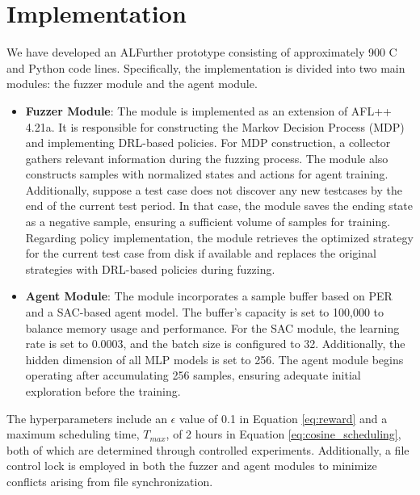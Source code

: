 \documentclass[lettersize,journal]{IEEEtran}
\begin{document}
\section{Implementation}
We have developed an ALFurther prototype consisting of approximately 900 C and Python code lines. Specifically, the implementation is divided into two main modules: the fuzzer module and the agent module.
\begin{itemize}
	\item \textbf{Fuzzer Module}: The module is implemented as an extension of AFL++ 4.21a. It is responsible for constructing the Markov Decision Process (MDP) and implementing DRL-based policies. For MDP construction, a collector gathers relevant information during the fuzzing process. The module also constructs samples with normalized states and actions for agent training. Additionally, suppose a test case does not discover any new testcases by the end of the current test period. In that case, the module saves the ending state as a negative sample, ensuring a sufficient volume of samples for training. Regarding policy implementation, the module retrieves the optimized strategy for the current test case from disk if available and replaces the original strategies with DRL-based policies during fuzzing.
	
	\item \textbf{Agent Module}: The module incorporates a sample buffer based on PER and a SAC-based agent model. The buffer's capacity is set to 100,000 to balance memory usage and performance. For the SAC module, the learning rate is set to 0.0003, and the batch size is configured to 32. Additionally, the hidden dimension of all MLP models is set to 256. The agent module begins operating after accumulating 256 samples, ensuring adequate initial exploration before the training.
\end{itemize}
The hyperparameters include an $\epsilon$ value of 0.1 in Equation \ref{eq:reward} and a maximum scheduling time, $T_{\textit{max}}$, of 2 hours in Equation \ref{eq:cosine_scheduling}, both of which are determined through controlled experiments. Additionally, a file control lock is employed in both the fuzzer and agent modules to minimize conflicts arising from file synchronization.
\end{document}
